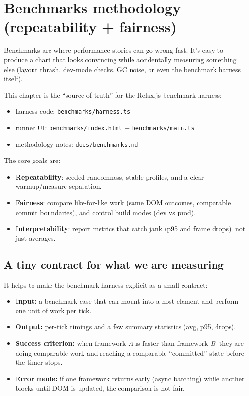\chapter{Benchmarks methodology (repeatability + fairness)}
\label{ch:benchmarks-methodology}

Benchmarks are where performance stories can go wrong fast.
It's easy to produce a chart that looks convincing while accidentally measuring something else (layout thrash, dev-mode checks, GC noise, or even the benchmark harness itself).

This chapter is the “source of truth” for the Relax.js benchmark harness:

\begin{itemize}
\item harness code: \texttt{benchmarks/harness.ts}
\item runner UI: \texttt{benchmarks/index.html} + \texttt{benchmarks/main.ts}
\item methodology notes: \texttt{docs/benchmarks.md}
\end{itemize}

The core goals are:

\begin{itemize}
\item \textbf{Repeatability}: seeded randomness, stable profiles, and a clear warmup/measure separation.
\item \textbf{Fairness}: compare like-for-like work (same DOM outcomes, comparable commit boundaries), and control build modes (dev vs prod).
\item \textbf{Interpretability}: report metrics that catch jank (p95 and frame drops), not just averages.
\end{itemize}

\section{A tiny contract for what we are measuring}

It helps to make the benchmark harness explicit as a small contract:

\begin{itemize}
\item \textbf{Input:} a benchmark case that can mount into a host element and perform one unit of work per tick.
\item \textbf{Output:} per-tick timings and a few summary statistics (avg, p95, drops).
\item \textbf{Success criterion:} when framework \emph{A} is faster than framework \emph{B}, they are doing comparable work and reaching a comparable ``committed'' state before the timer stops.
\item \textbf{Error mode:} if one framework returns early (async batching) while another blocks until DOM is updated, the comparison is not fair.
\end{itemize}

